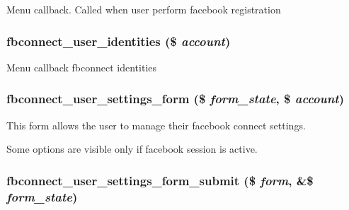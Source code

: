 Menu callback. Called when user perform facebook registration \hypertarget{fbconnect_8pages_8inc_4c9a902194766c0f0671374dc132d8c3}{
\subsubsection[{fbconnect\_\-user\_\-identities}]{\setlength{\rightskip}{0pt plus 5cm}fbconnect\_\-user\_\-identities (\$ {\em account})}}
\label{fbconnect_8pages_8inc_4c9a902194766c0f0671374dc132d8c3}


Menu callback fbconnect identities \hypertarget{fbconnect_8pages_8inc_8d3b04be3466ffb204c2fc795b35e90e}{
\subsubsection[{fbconnect\_\-user\_\-settings\_\-form}]{\setlength{\rightskip}{0pt plus 5cm}fbconnect\_\-user\_\-settings\_\-form (\$ {\em form\_\-state}, \/  \$ {\em account})}}
\label{fbconnect_8pages_8inc_8d3b04be3466ffb204c2fc795b35e90e}


This form allows the user to manage their facebook connect settings.

Some options are visible only if facebook session is active. \hypertarget{fbconnect_8pages_8inc_932ccba1394c39dc66c0b01f361935ba}{
\subsubsection[{fbconnect\_\-user\_\-settings\_\-form\_\-submit}]{\setlength{\rightskip}{0pt plus 5cm}fbconnect\_\-user\_\-settings\_\-form\_\-submit (\$ {\em form}, \/  \&\$ {\em form\_\-state})}}
\label{fbconnect_8pages_8inc_932ccba1394c39dc66c0b01f361935ba}



